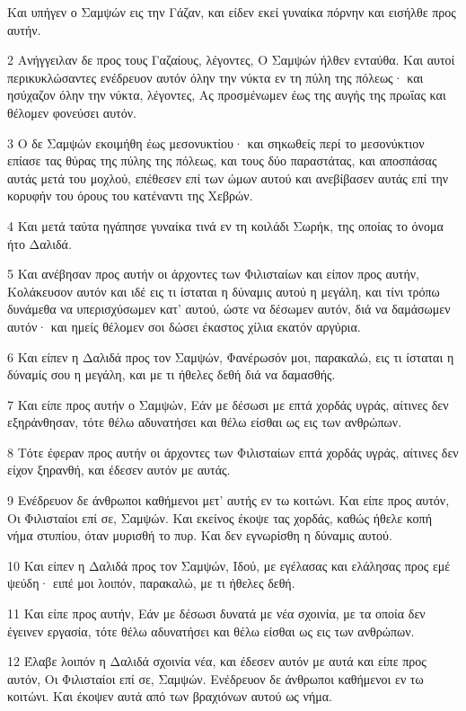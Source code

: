 \par Και υπήγεν ο Σαμψών εις την Γάζαν, και είδεν εκεί γυναίκα πόρνην και εισήλθε προς αυτήν.
\par 2 Ανήγγειλαν δε προς τους Γαζαίους, λέγοντες, Ο Σαμψών ήλθεν ενταύθα. Και αυτοί περικυκλώσαντες ενέδρευον αυτόν όλην την νύκτα εν τη πύλη της πόλεως· και ησύχαζον όλην την νύκτα, λέγοντες, Ας προσμένωμεν έως της αυγής της πρωΐας και θέλομεν φονεύσει αυτόν.
\par 3 Ο δε Σαμψών εκοιμήθη έως μεσονυκτίου· και σηκωθείς περί το μεσονύκτιον επίασε τας θύρας της πύλης της πόλεως, και τους δύο παραστάτας, και αποσπάσας αυτάς μετά του μοχλού, επέθεσεν επί των ώμων αυτού και ανεβίβασεν αυτάς επί την κορυφήν του όρους του κατέναντι της Χεβρών.
\par 4 Και μετά ταύτα ηγάπησε γυναίκα τινά εν τη κοιλάδι Σωρήκ, της οποίας το όνομα ήτο Δαλιδά.
\par 5 Και ανέβησαν προς αυτήν οι άρχοντες των Φιλισταίων και είπον προς αυτήν, Κολάκευσον αυτόν και ιδέ εις τι ίσταται η δύναμις αυτού η μεγάλη, και τίνι τρόπω δυνάμεθα να υπερισχύσωμεν κατ' αυτού, ώστε να δέσωμεν αυτόν, διά να δαμάσωμεν αυτόν· και ημείς θέλομεν σοι δώσει έκαστος χίλια εκατόν αργύρια.
\par 6 Και είπεν η Δαλιδά προς τον Σαμψών, Φανέρωσόν μοι, παρακαλώ, εις τι ίσταται η δύναμίς σου η μεγάλη, και με τι ήθελες δεθή διά να δαμασθής.
\par 7 Και είπε προς αυτήν ο Σαμψών, Εάν με δέσωσι με επτά χορδάς υγράς, αίτινες δεν εξηράνθησαν, τότε θέλω αδυνατήσει και θέλω είσθαι ως εις των ανθρώπων.
\par 8 Τότε έφεραν προς αυτήν οι άρχοντες των Φιλισταίων επτά χορδάς υγράς, αίτινες δεν είχον ξηρανθή, και έδεσεν αυτόν με αυτάς.
\par 9 Ενέδρευον δε άνθρωποι καθήμενοι μετ' αυτής εν τω κοιτώνι. Και είπε προς αυτόν, Οι Φιλισταίοι επί σε, Σαμψών. Και εκείνος έκοψε τας χορδάς, καθώς ήθελε κοπή νήμα στυπίου, όταν μυρισθή το πυρ. Και δεν εγνωρίσθη η δύναμις αυτού.
\par 10 Και είπεν η Δαλιδά προς τον Σαμψών, Ιδού, με εγέλασας και ελάλησας προς εμέ ψεύδη· ειπέ μοι λοιπόν, παρακαλώ, με τι ήθελες δεθή.
\par 11 Και είπε προς αυτήν, Εάν με δέσωσι δυνατά με νέα σχοινία, με τα οποία δεν έγεινεν εργασία, τότε θέλω αδυνατήσει και θέλω είσθαι ως εις των ανθρώπων.
\par 12 Έλαβε λοιπόν η Δαλιδά σχοινία νέα, και έδεσεν αυτόν με αυτά και είπε προς αυτόν, Οι Φιλισταίοι επί σε, Σαμψών. Ενέδρευον δε άνθρωποι καθήμενοι εν τω κοιτώνι. Και έκοψεν αυτά από των βραχιόνων αυτού ως νήμα.
